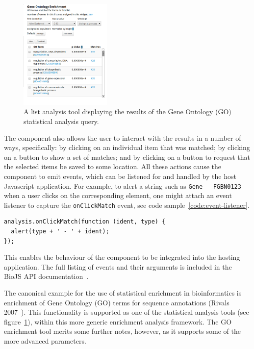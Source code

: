 \documentclass[10pt,a4paper,twocolumn]{article}
\begin{document}
\begin{figure}[hbp]
\centering
\includegraphics[width=0.4\textwidth]{go-enrichment.png}
\caption{\label{fig:go-enrichment}A list analysis tool displaying the results of the Gene Ontology (GO)
statistical analysis query.}
\end{figure}

The component also allows the user to interact with the results in a number of ways, specifically: 
by clicking on an individual item that was matched; by clicking on a button to show a set of
matches; and by clicking on a button to request that the selected items be saved to some location.
All these actions cause the component to emit events, which can be listened for and handled
by the host Javascript application. For example, to alert a string such as \texttt{Gene - FGBN0123}
when a user clicks on the corresponding element, one might attach an event listener to
capture the \texttt{onClickMatch} event, see code sample~\ref{code:event-listener}.

\begin{lstlisting}[caption={Listening for a click event.}, label={code:event-listener}]
analysis.onClickMatch(function (ident, type) {
  alert(type + ' - ' + ident);
});
\end{lstlisting}

This enables the behaviour of the component to be integrated into
the hosting application. The full listing of events and their arguments is
included in the BioJS API documentation~\cite{site:biojs-doc}.

The canonical example for the use of statistical enrichment in bioinformatics is enrichment of Gene
Ontology (GO) terms for sequence annotations (Rivals 2007~\cite{rivals}). This functionality
is supported as one of the statistical analysis tools
(see figure~\ref{fig:go-enrichment}), within this more
generic enrichment analysis framework. The GO enrichment
tool merits some further notes, however, as it supports some
of the more advanced parameters.
\end{document}
